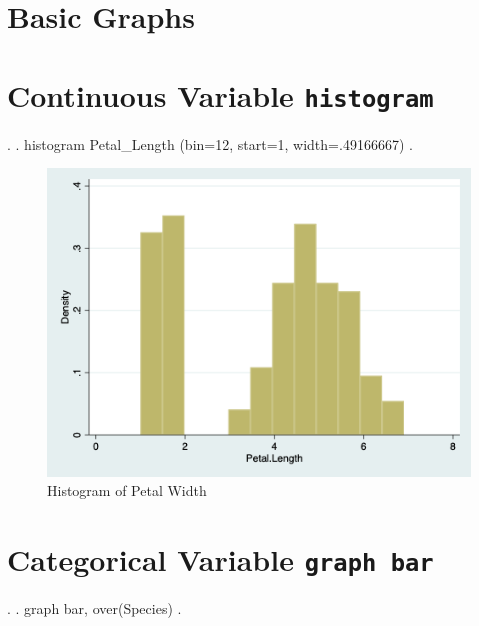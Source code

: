 \documentclass[]{article}
\begin{document}
\hypertarget{basic-graphs}{%
\section{Basic Graphs}\label{basic-graphs}}

\hypertarget{continuous-variable-histogram}{%
\section{\texorpdfstring{Continuous Variable
\texttt{histogram}}{Continuous Variable histogram}}\label{continuous-variable-histogram}}

\begin{stlog}
. 
. histogram Petal_Length
(bin=12, start=1, width=.49166667)
{\smallskip}
. 
\end{stlog}

\begin{stlog}


{\smallskip}

\end{stlog}

\begin{figure}
\centering
\includegraphics[width=0.75\linewidth]{myhistogram.png}
\caption{Histogram of Petal Width}
\end{figure}

\hypertarget{categorical-variable-graph-bar}{%
\section{\texorpdfstring{Categorical Variable
\texttt{graph\ bar}}{Categorical Variable graph bar}}\label{categorical-variable-graph-bar}}

\begin{stlog}
. 
. graph bar, over(Species)
{\smallskip}
. 
\end{stlog}
\end{document}
